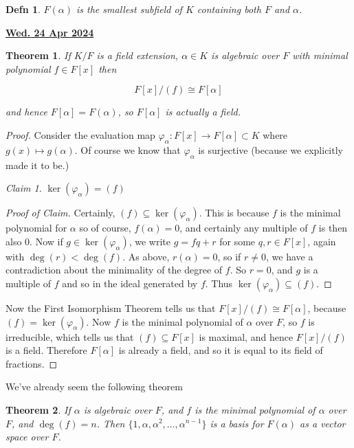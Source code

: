 \documentclass[12pt]{article}
\renewcommand{\date}[1]{\underline{\bf #1}}
\newtheorem{theorem}{Theorem}
\newtheorem{definition}{Defn}
\theoremstyle{remark}
\theoremstyle{remark}
\newtheorem{claim}{Claim}
\theoremstyle{remark}
\theoremstyle{remark}
\theoremstyle{remark}
\begin{document}
\begin{definition}
  $F(\alpha)$ is the smallest subfield of $K$ containing both $F$ and $\alpha$.
\end{definition}

\date{Wed. 24 Apr 2024}

\begin{theorem}
  If $K / F$ is a field extension, $\alpha \in K$ is algebraic over $F$ with
  minimal polynomial $f \in F[x]$ then

  \[
    F[x] / (f) \cong F[\alpha]
  \]

  and hence $F[\alpha] = F(\alpha)$, so $F[\alpha]$ is actually a field.
\end{theorem}

\begin{proof}
  Consider the evaluation map $\varphi_{\alpha}: F[x] \to F[\alpha] \subset K$
  where $g(x) \mapsto g(\alpha)$. Of course we know that $\varphi_{\alpha}$ is
  surjective (because we explicitly made it to be.)

  \begin{claim}
    $\ker(\varphi_{\alpha}) = (f)$
  \end{claim}
  \begin{proof}[Proof of Claim]
    Certainly, $(f) \subseteq \ker(\varphi_{\alpha})$. This is because $f$ is
    the minimal polynomial for $\alpha$ so of course, $f(\alpha) = 0$, and
    certainly any multiple of $f$ is then also $0$. Now if $g \in
    \ker(\varphi_{\alpha})$, we write $g = fq + r$ for some $q, r \in F[x]$,
    again with $\deg(r) < \deg(f)$. As above, $r(\alpha) = 0$, so if $r \ne 0$,
    we have a contradiction about the minimality of the degree of $f$. So $r =
    0$, and $g$ is a multiple of $f$ and so in the ideal generated by $f$. Thus
    $\ker(\varphi_{\alpha}) \subseteq (f)$.
  \end{proof}

  Now the First Isomorphism Theorem tells us that $F[x] / (f) \cong F[\alpha]$,
  because $(f) = \ker(\varphi_{\alpha})$. Now $f$ is the minimal polynomial of
  $\alpha$ over $F$, so $f$ is irreducible, which tells us that $(f) \subseteq
  F[x]$ is maximal, and hence $F[x] / (f)$ is a field. Therefore $F[\alpha]$ is
  already a field, and so it is equal to its field of fractions.
\end{proof}

We've already seem the following theorem

\begin{theorem}
  If $\alpha$ is algebraic over $F$, and $f$ is the minimal polynomial of
  $\alpha$ over $F$, and $\deg (f) = n$. Then $\{1, \alpha, \alpha^2, \dots,
  \alpha^{n - 1}\}$ is a basis for $F(\alpha)$ as a vector space over $F$.
\end{theorem}
\end{document}
